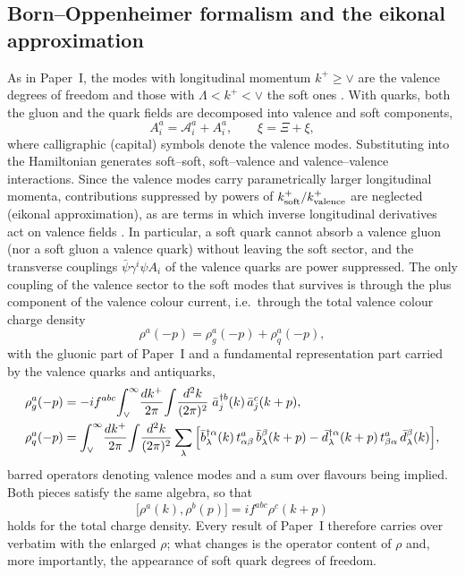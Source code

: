 \subsection{Born--Oppenheimer formalism and the eikonal approximation}
\label{sec:BO}

As in Paper~I, the modes with longitudinal momentum $k^{+}\ge\vee$ are the valence degrees of
freedom and those with $\Lambda<k^{+}<\vee$ the soft ones \cite{McLerran:1993ni,McLerran:1993ka}.
With quarks, both the gluon and the quark fields are decomposed into valence and soft
components,
\begin{equation}
A^{a}_{i}=\mathcal A^{a}_{i}+A^{a}_{i},\qquad
\xi=\Xi+\xi ,
\label{eq:split}
\end{equation}
where calligraphic (capital) symbols denote the valence modes. Substituting into the Hamiltonian
generates soft--soft, soft--valence and valence--valence interactions. Since the valence modes
carry parametrically larger longitudinal momenta, contributions suppressed by powers of
$k^{+}_{\rm soft}/k^{+}_{\rm valence}$ are neglected (eikonal approximation), as are terms in which
inverse longitudinal derivatives act on valence fields \cite{Lublinsky:2016meo,PaperI}. In
particular, a soft quark cannot absorb a valence gluon (nor a soft gluon a valence quark) without
leaving the soft sector, and the transverse couplings $\bar\psi\gamma^{i}\psi A_{i}$ of the
valence quarks are power suppressed. The only coupling of the valence sector to the soft modes
that survives is through the plus component of the valence colour current, i.e.\ through the
total valence colour charge density
\begin{equation}
\rho^{a}(-p)=\rho^{a}_{g}(-p)+\rho^{a}_{q}(-p),
\label{eq:rho}
\end{equation}
with the gluonic part of Paper~I and a fundamental representation part carried by the valence
quarks and antiquarks,
\begin{align}
\rho^{a}_{g}(-p)&=-if^{abc}\!\int_{\vee}^{\infty}\!\frac{dk^{+}}{2\pi}\!\int\!\frac{d^{2}k}{(2\pi)^{2}}\;
\bar a^{\dagger b}_{j}(k)\,\bar a^{c}_{j}(k+p),
\label{eq:rhog}\\
\rho^{a}_{q}(-p)&=\int_{\vee}^{\infty}\!\frac{dk^{+}}{2\pi}\!\int\!\frac{d^{2}k}{(2\pi)^{2}}
\sum_{\lambda}\Big[\bar b^{\dagger\alpha}_{\lambda}(k)\,t^{a}_{\alpha\beta}\,\bar b^{\beta}_{\lambda}(k+p)
-\bar d^{\dagger\alpha}_{\lambda}(k+p)\,t^{a}_{\beta\alpha}\,\bar d^{\beta}_{\lambda}(k)\Big],
\label{eq:rhoq}
\end{align}
barred operators denoting valence modes and a sum over flavours being implied. Both pieces
satisfy the same algebra, so that
\begin{equation}
\big[\rho^{a}(k),\rho^{b}(p)\big]=if^{abc}\rho^{c}(k+p)
\label{eq:rhoalg}
\end{equation}
holds for the total charge density. Every result of Paper~I therefore carries over verbatim
with the enlarged $\rho$; what changes is the operator content of $\rho$ and, more importantly,
the appearance of soft quark degrees of freedom.

